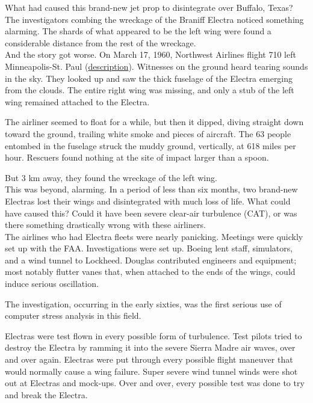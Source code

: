 What had caused this brand-new jet prop to disintegrate over Buffalo, Texas? \\

The investigators combing the wreckage of the Braniff Electra noticed something alarming. The shards of what appeared to be the left wing were found a considerable distance from the rest of the wreckage. \\

And the story got worse.
On March 17, 1960, Northwest Airlines flight 710 left Minneapolis-St. Paul (\href{http://www.baaa-acro.com/1960/archives/crash-of-a-lockheed-l-188-electra-in-tell-city-63-killed/}{description}). 
Witnesses on the ground heard tearing sounds in the sky. They looked up and saw the thick fuselage of the Electra emerging from the clouds. The entire right wing was missing, and only a stub of the left wing remained attached to the Electra.

The airliner seemed to float for a while, but then it dipped, diving straight down toward the ground, trailing white smoke and pieces of aircraft. The 63 people entombed in the fuselage struck the muddy ground, vertically, at 618 miles per hour.
Rescuers found nothing at the site of impact larger than a spoon.

But 3 km away, they found the wreckage of the left wing. \\

This was beyond, alarming. In a period of less than six months, two brand-new Electras lost their wings and disintegrated with much loss of life. What could have caused this? Could it have been severe clear-air turbulence (CAT), or was there something drastically wrong with these airliners. \\

The airlines who had Electra fleets were nearly panicking. Meetings were quickly set up with the FAA. Investigations were set up. 
Boeing lent staff, simulators, and a wind tunnel to Lockheed. Douglas contributed engineers and equipment; most notably flutter vanes that, when attached to the ends of the wings, could induce serious oscillation.

The investigation, occurring in the early sixties, was the first serious use of computer stress analysis in this field.

Electras were test flown in every possible form of turbulence. Test pilots tried to destroy the Electra by ramming it into the severe Sierra Madre air waves, over and over again. Electras were put through every possible flight maneuver that would normally cause a wing failure. Super severe wind tunnel winds were shot out at Electras and mock-ups. Over and over, every possible test was done to try and break the Electra. \\

